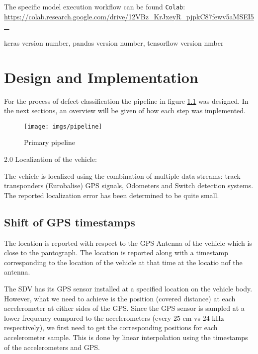 \noindent The specific model execution workflow can be found \verb|Colab|:\\
\url{https://colab.research.google.com/drive/12VBz_KrJxeyR_pjpkC87fewv5aMSEI5_}

keras version number, pandas version number, tensorflow version nmber


\chapter{Design and Implementation}
For the process of defect classification the pipeline in figure \ref{fig:pipeline} was designed. In the next sections, an overview will be given of how each step was implemented.
\begin{figure}[H]
	\centering
	\texttt{[image: imgs/pipeline]}
	\caption{Primary pipeline}
	\label{fig:pipeline}
\end{figure}



2.0 Localization of the vehicle:

The vehicle is localized using the combination of multiple data streams: track transponders (Eurobalise) GPS signals, Odometers and Switch detection systems. The reported localization error has been determined to be quite small.

\section{Shift of GPS timestamps}
The location is reported with respect to the GPS Antenna of the vehicle which is close to the pantograph. The location is reported along with a timestamp corresponding to the location of the vehicle at that time at the locatio nof the antenna. 

The SDV has its GPS sensor installed at a specified location on the vehicle body. However, what we need to achieve is the position (covered distance) at each accelerometer at either sides of the GPS. Since the GPS sensor is sampled at a lower frequency compared to the accelerometers (every $25$ cm vs $24$ kHz respectively), we first need to get the corresponding positions for each accelerometer sample. This is done by linear interpolation using the timestamps of the accelerometers and GPS. 

